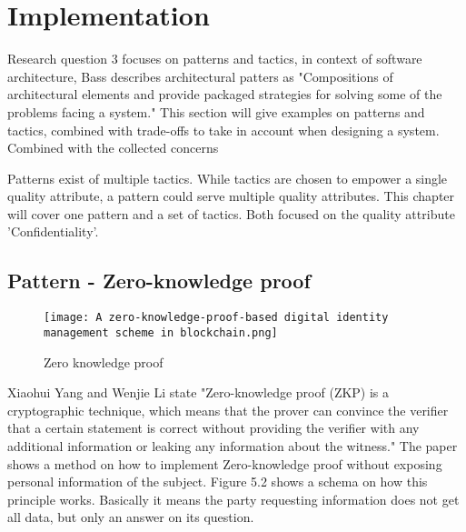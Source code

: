 \chapter{Implementation}\label{s:Implementation}
Research question 3 focuses on patterns and tactics, in context of software architecture, Bass \etal \cite{Bass2015SoftwareAI} describes architectural patters as "Compositions of architectural elements and provide packaged strategies for solving some of the problems facing a system." This section will give examples on patterns and tactics, combined with trade-offs to take in account when designing a system. Combined with the collected concerns

Patterns exist of multiple tactics. While tactics are chosen to empower a single quality attribute, a pattern could serve multiple quality attributes. This chapter will cover one pattern and a set of tactics. Both focused on the quality attribute 'Confidentiality'.

\section{Pattern - Zero-knowledge proof}
\graphicspath{ {./images/} }
\begin{figure}[t]
\centering
\label{fig:ZKP}
\texttt{[image: A zero-knowledge-proof-based digital identity management scheme in blockchain.png]}\\
\caption{Zero knowledge proof}
\end{figure}

Xiaohui Yang and Wenjie Li\cite{YANG2020102050} state "Zero-knowledge proof (ZKP) is a cryptographic technique,
which means that the prover can convince the verifier that a certain statement is correct without providing the verifier with any additional information or leaking any information about the witness." The paper shows a method on how to implement Zero-knowledge proof without exposing personal information of the subject. Figure 5.2 shows a schema on how this principle works. Basically it means the party requesting information does not get all data, but only an answer on its question.

